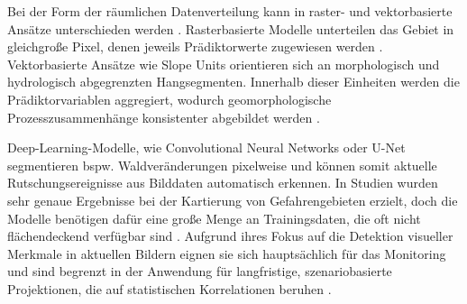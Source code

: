\documentclass[../main.tex]{subfiles}
\begin{document}
Bei der Form der räumlichen Datenverteilung kann in raster- und vektorbasierte Ansätze unterschieden werden \autocite{scaioniRemoteSensingLandslide2014}. Rasterbasierte Modelle unterteilen das Gebiet in gleichgroße Pixel, denen jeweils Prädiktorwerte zugewiesen werden \autocite{wenSHAPenhancedXGBoostModel2024, huangModellingLandslideSusceptibility2024}. Vektorbasierte Ansätze wie Slope Units orientieren sich an morphologisch und hydrologisch abgegrenzten Hangsegmenten. Innerhalb dieser Einheiten werden die Prädiktorvariablen aggregiert, wodurch geomorphologische Prozesszusammenhänge konsistenter abgebildet werden \autocite{wenSHAPenhancedXGBoostModel2024, huangModellingLandslideSusceptibility2024}.

Deep-Learning-Modelle, wie Convolutional Neural Networks oder U-Net segmentieren bspw. Waldveränderungen pixelweise und können somit aktuelle Rutschungsereignisse aus Bilddaten automatisch erkennen. In Studien wurden sehr genaue Ergebnisse bei der Kartierung von Gefahrengebieten erzielt, doch die Modelle benötigen dafür eine große Menge an Trainingsdaten, die oft nicht flächendeckend verfügbar sind \autocite{jinAccurateLandslideIdentification2022, pyoGeneralizationUNetSemantic2022}. Aufgrund ihres Fokus auf die Detektion visueller Merkmale in aktuellen Bildern eignen sie sich hauptsächlich für das Monitoring und sind begrenzt in der Anwendung für langfristige, szenariobasierte Projektionen, die auf statistischen Korrelationen beruhen \autocite{mondiniShortLongTerm2025, jinAccurateLandslideIdentification2022, pyoGeneralizationUNetSemantic2022}.
\end{document}
